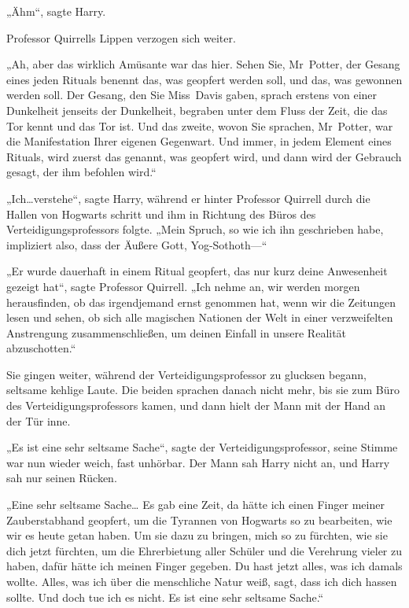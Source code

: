 {„Ähm“, sagte Harry.

Professor Quirrells Lippen verzogen sich weiter.

„Ah, aber das wirklich Amüsante war das hier. Sehen Sie, Mr~Potter, der Gesang eines jeden Rituals benennt das, was geopfert werden soll, und das, was gewonnen werden soll. Der Gesang, den Sie Miss~Davis gaben, sprach erstens von einer Dunkelheit jenseits der Dunkelheit, begraben unter dem Fluss der Zeit, die das Tor kennt und das Tor ist. Und das zweite, wovon Sie sprachen, Mr~Potter, war die Manifestation Ihrer eigenen Gegenwart. Und immer, in jedem Element eines Rituals, wird zuerst das genannt, was geopfert wird, und dann wird der Gebrauch gesagt, der ihm befohlen wird.“

„Ich…verstehe“, sagte Harry, während er hinter Professor Quirrell durch die Hallen von Hogwarts schritt und ihm in Richtung des Büros des Verteidigungsprofessors folgte. „Mein Spruch, so wie ich ihn geschrieben habe, impliziert also, dass der Äußere Gott, Yog-Sothoth—“

„Er wurde dauerhaft in einem Ritual geopfert, das nur kurz deine Anwesenheit gezeigt hat“, sagte Professor Quirrell. „Ich nehme an, wir werden morgen herausfinden, ob das irgendjemand ernst genommen hat, wenn wir die Zeitungen lesen und sehen, ob sich alle magischen Nationen der Welt in einer verzweifelten Anstrengung zusammenschließen, um deinen Einfall in unsere Realität abzuschotten.“

Sie gingen weiter, während der Verteidigungsprofessor zu glucksen begann, seltsame kehlige Laute. Die beiden sprachen danach nicht mehr, bis sie zum Büro des Verteidigungsprofessors kamen, und dann hielt der Mann mit der Hand an der Tür inne.

„Es ist eine sehr seltsame Sache“, sagte der Verteidigungsprofessor, seine Stimme war nun wieder weich, fast unhörbar. Der Mann sah Harry nicht an, und Harry sah nur seinen Rücken.

„Eine sehr seltsame Sache… Es gab eine Zeit, da hätte ich einen Finger meiner Zauberstabhand geopfert, um die Tyrannen von Hogwarts so zu bearbeiten, wie wir es heute getan haben. Um sie dazu zu bringen, mich so zu fürchten, wie sie dich jetzt fürchten, um die Ehrerbietung aller Schüler und die Verehrung vieler zu haben, dafür hätte ich meinen Finger gegeben. Du hast jetzt alles, was ich damals wollte. Alles, was ich über die menschliche Natur weiß, sagt, dass ich dich hassen sollte. Und doch tue ich es nicht. Es ist eine sehr seltsame Sache.“

}
